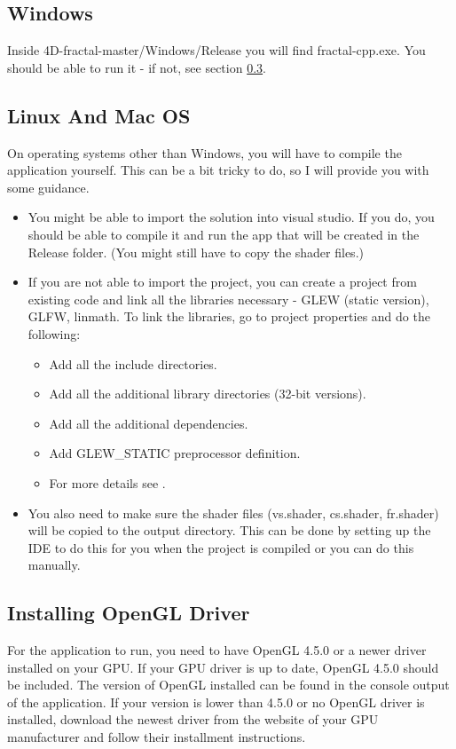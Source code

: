 \documentclass[11pt,a4paper,twoside,openright]{report}
\begin{document}
\subsection{Windows}
Inside 4D-fractal-master/Windows/Release you will find fractal-cpp.exe. You should be able to run it - if not, see section \ref{section:OpenGL}.
\subsection{Linux And Mac OS}
On operating systems other than Windows, you will have to compile the application yourself. This can be a bit tricky to do, so I will provide you with some guidance.
\begin{itemize}
    \item You might be able to import the solution into visual studio. If you do, you should be able to compile it and run the app that will be created in the Release folder. (You might still have to copy the shader files.) 
    \item If you are not able to import the project, you can create a project from existing code and link all the libraries necessary - GLEW (static version), GLFW, linmath. To link the libraries, go to project properties and do the following:
    \begin{itemize}
        \item Add all the include directories.
        \item Add all the additional library directories (32-bit versions).
        \item Add all the additional dependencies.
        \item Add GLEW\_STATIC preprocessor definition.
        \item For more details see \cite{cherno}.
    \end{itemize}
    \item You also need to make sure the shader files (vs.shader, cs.shader, fr.shader) will be copied to the output directory. This can be done by setting up the IDE to do this for you when the project is compiled or you can do this manually. 
\end{itemize}

\subsection{Installing OpenGL Driver}
\label{section:OpenGL}
For the application to run, you need to have OpenGL 4.5.0 or a newer driver installed on your GPU. If your GPU driver is up to date, OpenGL 4.5.0 should be included. The version of OpenGL installed can be found in the console output of the application. If your version is lower than 4.5.0 or no OpenGL driver is installed, download the newest driver from the website of your GPU manufacturer and follow their installment instructions.
\end{document}
